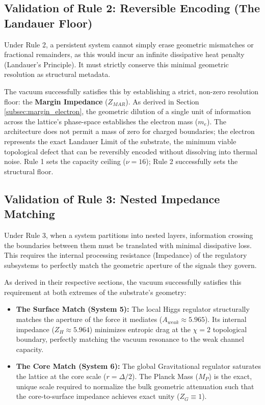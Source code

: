 \subsection{Validation of Rule 2: Reversible Encoding (The Landauer Floor)}
Under Rule 2, a persistent system cannot simply erase geometric mismatches or fractional remainders, as this would incur an infinite dissipative heat penalty (Landauer's Principle). It must strictly conserve this minimal geometric resolution as structural metadata. 

The vacuum successfully satisfies this by establishing a strict, non-zero resolution floor: the \textbf{Margin Impedance} ($Z_{MAR}$). As derived in Section \ref{subsec:margin_electron}, the geometric dilution of a single unit of information across the lattice's phase-space establishes the electron mass ($m_e$). The architecture does not permit a mass of zero for charged boundaries; the electron represents the exact Landauer Limit of the substrate, the minimum viable topological defect that can be reversibly encoded without dissolving into thermal noise. Rule 1 sets the capacity ceiling ($\nu=16$); Rule 2 successfully sets the structural floor.

\subsection{Validation of Rule 3: Nested Impedance Matching}
Under Rule 3, when a system partitions into nested layers, information crossing the boundaries between them must be translated with minimal dissipative loss. This requires the internal processing resistance (Impedance) of the regulatory subsystems to perfectly match the geometric aperture of the signals they govern.

As derived in their respective sections, the vacuum successfully satisfies this requirement at both extremes of the substrate's geometry:
\begin{itemize}
    \item \textbf{The Surface Match (System 5):} The local Higgs regulator structurally matches the aperture of the force it mediates ($A_{weak} \approx 5.965$). Its internal impedance ($Z_H \approx 5.964$) minimizes entropic drag at the $\chi=2$ topological boundary, perfectly matching the vacuum resonance to the weak channel capacity.
    \item \textbf{The Core Match (System 6):} The global Gravitational regulator saturates the lattice at the core scale ($r=\Delta/2$). The Planck Mass ($M_P$) is the exact, unique scale required to normalize the bulk geometric attenuation such that the core-to-surface impedance achieves exact unity ($Z_G \equiv 1$).
\end{itemize}

